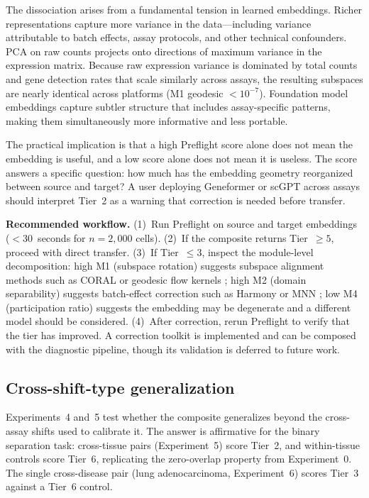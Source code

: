 \documentclass[11pt,letterpaper]{article}
\begin{document}
The dissociation arises from a fundamental tension in learned embeddings. Richer representations capture more variance in the data---including variance attributable to batch effects, assay protocols, and other technical confounders. PCA on raw counts projects onto directions of maximum variance in the expression matrix. Because raw expression variance is dominated by total counts and gene detection rates that scale similarly across assays, the resulting subspaces are nearly identical across platforms (M1 geodesic $< 10^{-7}$). Foundation model embeddings capture subtler structure that includes assay-specific patterns, making them simultaneously more informative and less portable.

The practical implication is that a high Preflight score alone does not mean the embedding is useful, and a low score alone does not mean it is useless. The score answers a specific question: how much has the embedding geometry reorganized between source and target? A user deploying Geneformer or scGPT across assays should interpret Tier~2 as a warning that correction is needed before transfer.

\textbf{Recommended workflow.} (1)~Run Preflight on source and target embeddings ($< 30$~seconds for $n = 2{,}000$ cells). (2)~If the composite returns Tier~$\geq 5$, proceed with direct transfer. (3)~If Tier~$\leq 3$, inspect the module-level decomposition: high M1 (subspace rotation) suggests subspace alignment methods such as CORAL \citep{sun2016coral} or geodesic flow kernels \citep{gong2012grassmann}; high M2 (domain separability) suggests batch-effect correction such as Harmony \citep{korsunsky2019harmony} or MNN \citep{haghverdi2018batch}; low M4 (participation ratio) suggests the embedding may be degenerate and a different model should be considered. (4)~After correction, rerun Preflight to verify that the tier has improved. A correction toolkit is implemented and can be composed with the diagnostic pipeline, though its validation is deferred to future work.

\subsection{Cross-shift-type generalization}

Experiments~4 and~5 test whether the composite generalizes beyond the cross-assay shifts used to calibrate it. The answer is affirmative for the binary separation task: cross-tissue pairs (Experiment~5) score Tier~2, and within-tissue controls score Tier~6, replicating the zero-overlap property from Experiment~0. The single cross-disease pair (lung adenocarcinoma, Experiment~6) scores Tier~3 against a Tier~6 control.
\end{document}
